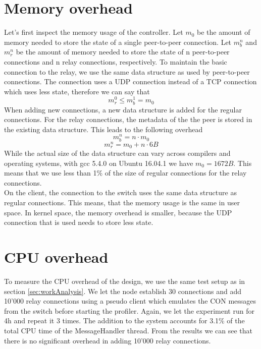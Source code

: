 \section{Memory overhead \label{evaluation:memory}}
Let's first inspect the memory usage of the controller.
Let $m_0$ be the amount of memory needed to store the state of a single peer-to-peer connection. Let $m_b^n$ and $m_r^n$ be the amount of memory needed to store the state of n peer-to-peer connections and n relay connections, respectively. To maintain the basic connection to the relay, we use the same data structure as used by peer-to-peer connections. The connection uses a UDP connection instead of a TCP connection which uses less state, therefore we can say that
\begin{equation}
	m_r^0 \leq m_b^1 = m_0
\end{equation}
When adding new connections, a new data structure is added for the regular connections. For the relay connections, the metadata of the the peer is stored in the existing data structure. This leads to the following overhead
\begin{equation}
	m_b^n = n\cdot m_0
\end{equation}
\begin{equation}
	m_r^n = m_0 + n\cdot 6B
\end{equation}
While the actual size of the data structure can vary across compilers and operating systems, with gcc 5.4.0 on Ubuntu 16.04.1 we have $m_0 = 1672B$. This means that we use less than 1\% of the size of regular connections for the relay connections.\\
On the client, the connection to the switch uses the same data structure as regular connections. This means, that the memory usage is the same in user space. In kernel space, the memory overhead is smaller, because the UDP connection that is used needs to store less state.







\section{CPU overhead\label{evaluation:cpu}}
To measure the CPU overhead of the design, we use the same test setup as in section \ref{sec:workAnalysis}. We let the node establish 30 connections and add 10'000 relay connections using a pseudo client which emulates the CON messages from the switch before starting the profiler. Again, we let the experiment run for 4h and repeat it 3 times. The addition to the system accounts for 3.1\% of the total CPU time of the MessageHandler thread. From the results we can see that there is no significant overhead in adding 10'000 relay connections.





